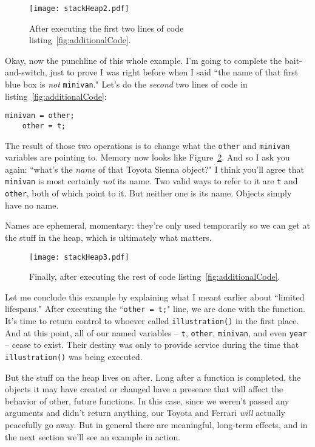 \begin{figure}[ht]
\centering
\texttt{[image: stackHeap2.pdf]}   %
\caption{After executing the first two lines of code
listing~\ref{fig:additionalCode}.}
\label{fig:stackHeap2}
\end{figure}


Okay, now the punchline of this whole example. I'm going to complete the
bait-and-switch, just to prove I was right before when I said ``the name of
that first blue box is \textit{not} \texttt{minivan}." Let's do the
\textit{second} two lines of code in listing~\ref{fig:additionalCode}:

\begin{Verbatim}[fontsize=\small,samepage=true]
    minivan = other;
    other = t;
\end{Verbatim}

The result of those two operations is to change what the \texttt{other} and
\texttt{minivan} variables are pointing to. Memory now looks like
Figure~\ref{fig:stackHeap3}. And so I ask you again: ``what's the
\textit{name} of that Toyota Sienna object?" I think you'll agree that
\texttt{minivan} is most certainly \textit{not} its name. Two valid ways to
refer to it are \texttt{t} and \texttt{other}, both of which point to it. But
neither one is its name. Objects simply have no name.

Names are ephemeral, momentary: they're only used temporarily so we can get at
the stuff in the heap, which is ultimately what matters.

\begin{figure}[ht]
\centering
\texttt{[image: stackHeap3.pdf]}   %
\caption{Finally, after executing the rest of code
listing~\ref{fig:additionalCode}.}
\label{fig:stackHeap3}
\end{figure}

Let me conclude this example by explaining what I meant earlier about
``limited lifespans." After executing the ``\texttt{other = t;}" line, we are
done with the function. It's time to return control to whoever called
\texttt{illustration()} in the first place. And at this point, all of our
named variables -- \texttt{t}, \texttt{other}, \texttt{minivan}, and even
\texttt{year} -- cease to exist. Their destiny was only to provide service
during the time that \texttt{illustration()} was being executed. 

But the stuff on the heap lives on after. Long after a function is completed,
the objects it may have created or changed have a presence that will affect
the behavior of other, future functions. In this case, since we weren't passed
any arguments and didn't return anything, our Toyota and Ferrari \textit{will}
actually peacefully go away. But in general there are meaningful, long-term
effects, and in the next section we'll see an example in action.

